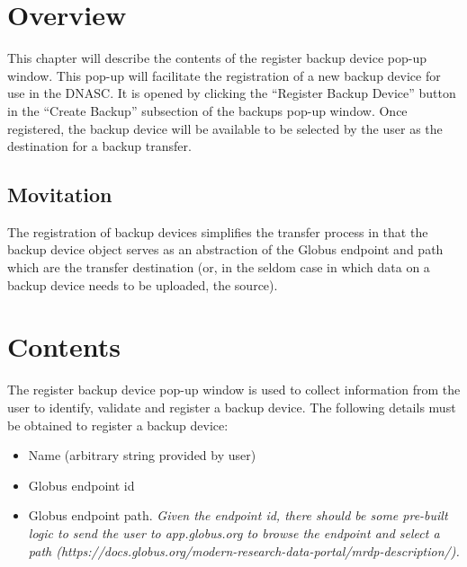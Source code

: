 
\section{Overview}

This chapter will describe the contents of the register backup device pop-up 
window. This pop-up will facilitate the registration of a new backup device
for use in the DNASC. It is opened by clicking the ``Register Backup Device''
button in the ``Create Backup'' subsection of the backups pop-up window.
Once registered, the backup device will be available to be selected by the
user as the destination for a backup transfer.

\subsection{Movitation}
The registration of backup devices simplifies the transfer process in that the 
backup device object serves as an abstraction of the Globus endpoint and path 
which are the transfer destination (or, in the seldom case in which data on 
a backup device needs to be uploaded, the source).

\section{Contents}

The register backup device pop-up window is used to collect information from
the user to identify, validate and register a backup device. The following details 
must be obtained to register a backup device:
\begin{itemize}\itemsep1pt
    \item Name (arbitrary string provided by user)
    \item Globus endpoint id
    \item Globus endpoint path. \emph{Given the endpoint id, there should be some pre-built logic to send the user to
app.globus.org to browse the endpoint and select a path (https://docs.globus.org/modern-research-data-portal/mrdp-description/).}
\end{itemize}

